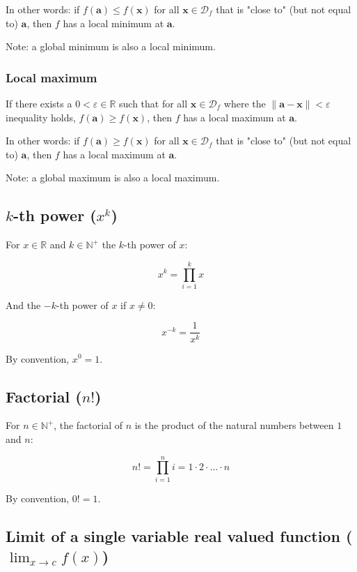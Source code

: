 \documentclass{article}
\begin{document}
          In other words: if $f(\mathbf{a}) \leq f(\mathbf{x})$ for all
          $\mathbf{x} \in \mathcal{D}_f$ that is "close to" (but not equal to)
          $\mathbf{a}$, then $f$ has a local minimum at $\mathbf{a}$.

          Note: a global minimum is also a local minimum.

        \subsubsection{Local maximum}

          If there exists a $0 < \varepsilon \in \mathbb{R}$ such that for all
          $\mathbf{x} \in \mathcal{D}_f$ where the
          $\| \mathbf{a} - \mathbf{x} \| < \varepsilon$ inequality holds,
          $f(\mathbf{a}) \geq f(\mathbf{x})$, then $f$ has a local maximum at
          $\mathbf{a}$.

          In other words: if $f(\mathbf{a}) \geq f(\mathbf{x})$ for all
          $\mathbf{x} \in \mathcal{D}_f$ that is "close to" (but not equal to)
          $\mathbf{a}$, then $f$ has a local maximum at $\mathbf{a}$.

          Note: a global maximum is also a local maximum.

      \subsection{$k$-th power ($x^k$)}

        For $x \in \mathbb{R}$ and $k \in \mathbb{N}^+$ the $k$-th power of $x$:

        $$x^k = \prod_{i=1}^k x$$

        And the $-k$-th power of $x$ if $x \neq 0$:

        $$x^{-k} = \frac{1}{x^k}$$

        By convention, $x^0 = 1$.

      \subsection{Factorial ($n!$)}

        For $n \in \mathbb{N}^+$, the factorial of $n$ is the product of
        the natural numbers between $1$ and $n$:

        $$n! = \prod_{i=1}^n i = 1 \cdot 2 \cdot \ldots \cdot n$$

        By convention, $0! = 1$.

      \subsection{%
        Limit of a single variable real valued function ($\lim_{x \to c} f(x)$)
      }
\end{document}
